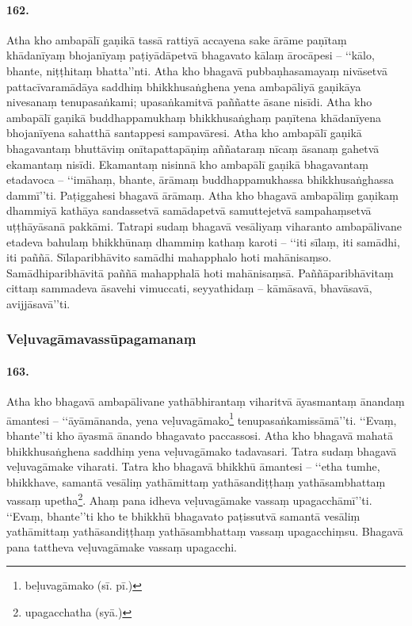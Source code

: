 \paragraph{162.} Atha kho ambapālī gaṇikā tassā rattiyā accayena sake ārāme paṇītaṃ khādanīyaṃ bhojanīyaṃ paṭiyādāpetvā bhagavato kālaṃ ārocāpesi – ‘‘kālo, bhante, niṭṭhitaṃ bhatta’’nti. Atha kho bhagavā pubbaṇhasamayaṃ nivāsetvā pattacīvaramādāya saddhiṃ bhikkhusaṅghena yena ambapāliyā gaṇikāya nivesanaṃ tenupasaṅkami; upasaṅkamitvā paññatte āsane nisīdi. Atha kho ambapālī gaṇikā buddhappamukhaṃ bhikkhusaṅghaṃ paṇītena khādanīyena bhojanīyena sahatthā santappesi sampavāresi. Atha kho ambapālī gaṇikā bhagavantaṃ bhuttāviṃ onītapattapāṇiṃ aññataraṃ nīcaṃ āsanaṃ gahetvā ekamantaṃ nisīdi. Ekamantaṃ nisinnā kho ambapālī gaṇikā bhagavantaṃ etadavoca – ‘‘imāhaṃ, bhante, ārāmaṃ buddhappamukhassa bhikkhusaṅghassa dammī’’ti. Paṭiggahesi bhagavā ārāmaṃ. Atha kho bhagavā ambapāliṃ gaṇikaṃ dhammiyā kathāya sandassetvā samādapetvā samuttejetvā sampahaṃsetvā uṭṭhāyāsanā pakkāmi. Tatrapi sudaṃ bhagavā vesāliyaṃ viharanto ambapālivane etadeva bahulaṃ bhikkhūnaṃ dhammiṃ kathaṃ karoti – ‘‘iti sīlaṃ, iti samādhi, iti paññā. Sīlaparibhāvito samādhi mahapphalo hoti mahānisaṃso. Samādhiparibhāvitā paññā mahapphalā hoti mahānisaṃsā. Paññāparibhāvitaṃ cittaṃ sammadeva āsavehi vimuccati, seyyathidaṃ – kāmāsavā, bhavāsavā, avijjāsavā’’ti.

\subsubsection{Veḷuvagāmavassūpagamanaṃ}

\paragraph{163.} Atha kho bhagavā ambapālivane yathābhirantaṃ viharitvā āyasmantaṃ ānandaṃ āmantesi – ‘‘āyāmānanda, yena veḷuvagāmako\footnote{beḷuvagāmako (sī. pī.)} tenupasaṅkamissāmā’’ti. ‘‘Evaṃ, bhante’’ti kho āyasmā ānando bhagavato paccassosi. Atha kho bhagavā mahatā bhikkhusaṅghena saddhiṃ yena veḷuvagāmako tadavasari. Tatra sudaṃ bhagavā veḷuvagāmake viharati. Tatra kho bhagavā bhikkhū āmantesi – ‘‘etha tumhe, bhikkhave, samantā vesāliṃ yathāmittaṃ yathāsandiṭṭhaṃ yathāsambhattaṃ vassaṃ upetha\footnote{upagacchatha (syā.)}. Ahaṃ pana idheva veḷuvagāmake vassaṃ upagacchāmī’’ti. ‘‘Evaṃ, bhante’’ti kho te bhikkhū bhagavato paṭissutvā samantā vesāliṃ yathāmittaṃ yathāsandiṭṭhaṃ yathāsambhattaṃ vassaṃ upagacchiṃsu. Bhagavā pana tattheva veḷuvagāmake vassaṃ upagacchi.

